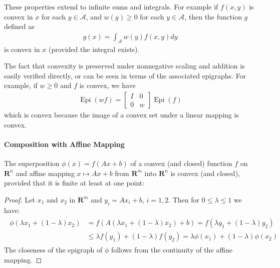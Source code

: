 \documentclass{article}
\newcommand{\Epi}{\operatorname{Epi} }
\begin{document}
These properties extend to infinite sums and integrals. For example if $f(x, y)$ is convex in $x$ for each $y \in \mathcal{A}$, and $w(y) \geq 0$ for each $y \in \mathcal{A}$, then the function $g$ defined as
\begin{align*}
g(x)=\int_{\mathcal{A}} w(y) f(x, y) d y
\end{align*}
is convex in $x$ (provided the integral exists).

The fact that convexity is preserved under nonnegative scaling and addition is easily verified directly, or can be seen in terms of the associated epigraphs. For example, if $w \geq 0$ and $f$ is convex, we have
\begin{align*}
\Epi (w f)=\left[\begin{array}{cc}
I & 0 \\
0 & w
\end{array}\right] \Epi(f)
\end{align*}
which is convex because the image of a convex set under a linear mapping is convex.
\paragraph{Composition with Affine Mapping}
The superposition $\phi(x)=f(A x+b)$ of a convex (and closed) function $f$ on $\mathbf{R}^{n}$ and affine mapping $x \mapsto A x+b$ from $\mathbf{R}^{m}$ into $\mathbf{R}^{n}$ is convex (and closed), provided that it is finite at least at one point:

\begin{proof}\color{ForestGreen}
Let $x_{1}$ and $x_{2}$ in $\mathbf{R}^{m}$ and $y_{i}=A x_{i}+b$, $i=1,2$. Then for $0 \leq \lambda \leq 1$ we have:
\begin{align*}
\begin{aligned}
\phi\left(\lambda x_{1}+(1-\lambda) x_{2}\right) &=f\left(A\left(\lambda x_{1}+(1-\lambda) x_{2}\right)+b\right)=f\left(\lambda y_{1}+(1-\lambda) y_{2}\right) \\
& \leq \lambda f\left(y_{1}\right)+(1-\lambda) f\left(y_{2}\right)=\lambda \phi\left(x_{1}\right)+(1-\lambda) \phi\left(x_{2}\right)
\end{aligned}
\end{align*}
The closeness of the epigraph of $\phi$ follows from the continuity of the affine mapping.
\end{proof}
\end{document}
